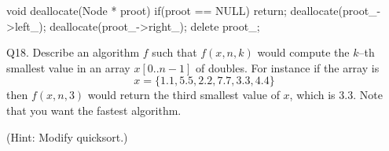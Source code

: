 \ANSWER
\begin{answercode}
void deallocate(Node * proot)
{
  if(proot == NULL) return;
  deallocate(proot_->left_);
  deallocate(proot_->right_);
  delete proot_;
}
\end{answercode}




\newpage
Q18.
Describe an algorithm $f$ such that $f(x, n, k)$ would
compute the $k$--th smallest value in an array $x[0..n - 1]$ of doubles.
For instance if the array is
\[
x = \{1.1, 5.5, 2.2, 7.7, 3.3, 4.4\}
\]
then $f(x, n, 3)$ would return the third smallest value of $x$, which is $3.3$.
Note that you want the fastest algorithm.

(Hint: Modify quicksort.)

\ANSWER
\begin{answercode}

\end{answercode}




